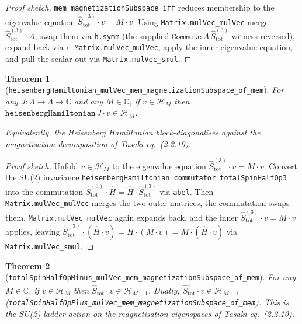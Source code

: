 \documentclass[a4paper,11pt]{article}
\newtheorem{theorem}{Theorem}
\begin{document}
\begin{proof}[Proof sketch]
\texttt{mem\_magnetizationSubspace\_iff} reduces membership to the
eigenvalue equation $\hat S_{\mathrm{tot}}^{(3)} \cdot v = M \cdot v$.
Using \texttt{Matrix.mulVec\_mulVec} merge $\hat S_{\mathrm{tot}}^{(3)}
\cdot A$, swap them via \texttt{h.symm} (the supplied $\texttt{Commute}\,
A\,\hat S_{\mathrm{tot}}^{(3)}$ witness reversed), expand back via
\texttt{← Matrix.mulVec\_mulVec}, apply the inner eigenvalue equation,
and pull the scalar out via \texttt{Matrix.mulVec\_smul}.
\end{proof}

\begin{theorem}[\texttt{heisenbergHamiltonian\_mulVec\_mem\_magnetizationSubspace\_of\_mem}]
For any $J : \Lambda \to \Lambda \to \mathbb{C}$ and any $M \in
\mathbb{C}$, if $v \in \mathcal H_{M}$ then
$\texttt{heisenbergHamiltonian}\,J \cdot v \in \mathcal H_{M}$.

Equivalently, the Heisenberg Hamiltonian block-diagonalises against
the magnetisation decomposition of Tasaki eq.~(2.2.10).
\end{theorem}

\begin{proof}[Proof sketch]
Unfold $v \in \mathcal H_{M}$ to the eigenvalue equation
$\hat S_{\mathrm{tot}}^{(3)} \cdot v = M \cdot v$.  Convert the SU(2)
invariance
\texttt{heisenbergHamiltonian\_commutator\_totalSpinHalfOp3} into the
commutation $\hat S_{\mathrm{tot}}^{(3)} \cdot \hat H = \hat H \cdot
\hat S_{\mathrm{tot}}^{(3)}$ via \texttt{abel}.  Then
\texttt{Matrix.mulVec\_mulVec} merges the two outer matrices, the
commutation swaps them, \texttt{Matrix.mulVec\_mulVec} again expands
back, and the inner $\hat S_{\mathrm{tot}}^{(3)} \cdot v = M \cdot v$
applies, leaving $\hat S_{\mathrm{tot}}^{(3)} \cdot (\hat H \cdot v)
= \hat H \cdot (M \cdot v) = M \cdot (\hat H \cdot v)$ via
\texttt{Matrix.mulVec\_smul}.
\end{proof}

\begin{theorem}[\texttt{totalSpinHalfOpMinus\_mulVec\_mem\_magnetizationSubspace\_of\_mem}]
For any $M \in \mathbb{C}$, if $v \in \mathcal H_{M}$ then
$\hat S_{\mathrm{tot}}^{-} \cdot v \in \mathcal H_{M-1}$.  Dually,
$\hat S_{\mathrm{tot}}^{+} \cdot v \in \mathcal H_{M+1}$
(\texttt{totalSpinHalfOpPlus\_mulVec\_mem\_magnetizationSubspace\_of\_mem}).
This is the SU(2) ladder action on the magnetisation eigenspaces of
Tasaki eq.~(2.2.10).
\end{theorem}
\end{document}

